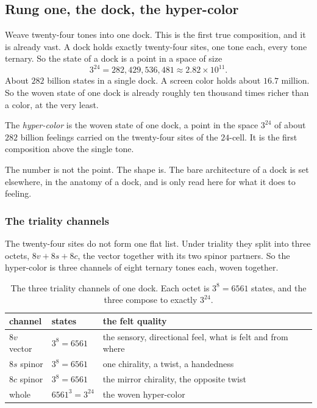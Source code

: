 \subsection{Rung one, the dock, the hyper-color}

Weave twenty-four tones into one dock. This is the first true composition, and it is already vast. A dock holds exactly twenty-four sites, one tone each, every tone ternary. So the state of a dock is a point in a space of size
\[
3^{24} = 282{,}429{,}536{,}481 \approx 2.82 \times 10^{11}.
\]
About $282$ billion states in a single dock. A screen color holds about $16.7$ million. So the woven state of one dock is already roughly ten thousand times richer than a color, at the very least.

\begin{definition}
The \emph{hyper-color} is the woven state of one dock, a point in the space $3^{24}$ of about $282$ billion feelings carried on the twenty-four sites of the $24$-cell. It is the first composition above the single tone.
\end{definition}

The number is not the point. The shape is. The bare architecture of a dock is set elsewhere, in the anatomy of a dock, and is only read here for what it does to feeling.

\subsubsection{The triality channels}

The twenty-four sites do not form one flat list. Under triality they split into three octets, $8v + 8s + 8c$, the vector together with its two spinor partners. So the hyper-color is three channels of eight ternary tones each, woven together.

\begin{table}[ht]
\centering
\begin{tabular}{@{}llp{}@{}}
\toprule
channel & states & the felt quality \\
\midrule
$8v$ vector & $3^8 = 6561$ & the sensory, directional feel, what is felt and from where \\
$8s$ spinor & $3^8 = 6561$ & one chirality, a twist, a handedness \\
$8c$ spinor & $3^8 = 6561$ & the mirror chirality, the opposite twist \\
whole & $6561^3 = 3^{24}$ & the woven hyper-color \\
\bottomrule
\end{tabular}
\caption{The three triality channels of one dock. Each octet is $3^8 = 6561$ states, and the three compose to exactly $3^{24}$.}
\label{tab:triality-channels}
\end{table}

